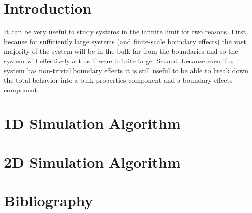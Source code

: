 \documentclass{article}
\begin{document}
\part*{Introduction}

It can be very useful to study systems in the infinite limit for two reasons.  First, because for sufficiently large systems (and finite-scale boundary effects) the vast majority of the system will be in the bulk far from the boundaries and so the system will effectively act as if were infinite large.  Second, because even if a system has non-trivial boundary effects it is still useful to be able to break down the total behavior into a bulk properties component and a boundary effects component.

\part{1D Simulation Algorithm}
\label{1dsim}

\part{2D Simulation Algorithm}
\label{2dsim}

\part*{Bibliography}



\end{document}
